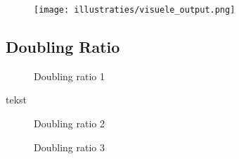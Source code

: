 \begin{figure}
   \centering
   \texttt{[image: illustraties/visuele\_output.png]}
\end{figure}

\subsection{Doubling Ratio}

\begin{figure}[H]

\label{doublingratio_1}
\caption{Doubling ratio 1}
\end{figure}
tekst
\begin{figure}[H]

\label{doublingratio_2}
\caption{Doubling ratio 2}
\end{figure}

\begin{figure}[h]

\label{doublingratio_3}
\caption{Doubling ratio 3}
\end{figure}
